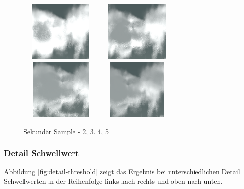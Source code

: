 \begin{figure}[H]
    \centering
    \includegraphics[width=4cm, height=3cm]{media/2nd-sample-2.png}
    \includegraphics[width=4cm, height=3cm]{media/2nd-sample-3.png}
    \includegraphics[width=4cm, height=3cm]{media/2nd-sample-4.png}
    \includegraphics[width=4cm, height=3cm]{media/2nd-sample-5.png}
    \caption{Sekundär Sample - 2, 3, 4, 5}
    \label{fig:2nd-sample}
\end{figure}

\subsubsection{Detail Schwellwert}
Abbildung \ref{fig:detail-threshold} zeigt das Ergebnis bei unterschiedlichen Detail Schwellwerten in der Reihenfolge links nach rechts und oben nach unten.


